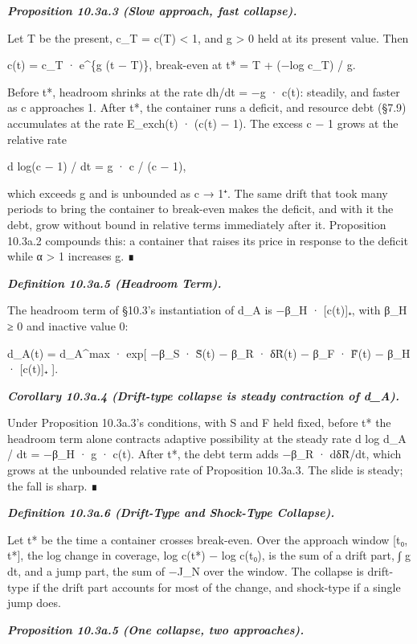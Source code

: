 \documentclass[
]{article}
\begin{document}
\emph{\textbf{Proposition 10.3a.3 (Slow approach, fast collapse).}}

Let T be the present, c\_T = c(T) \textless{} 1, and g \textgreater{} 0
held at its present value. Then

c(t) = c\_T · e\^{}\{g (t − T)\}, break-even at t* = T + (−log c\_T) /
g.

Before t*, headroom shrinks at the rate dh/dt = −g · c(t): steadily, and
faster as c approaches 1. After t*, the container runs a deficit, and
resource debt (§7.9) accumulates at the rate E\_exch(t) · (c(t) − 1).
The excess c − 1 grows at the relative rate

d log(c − 1) / dt = g · c / (c − 1),

which exceeds g and is unbounded as c → 1⁺. The same drift that took
many periods to bring the container to break-even makes the deficit, and
with it the debt, grow without bound in relative terms immediately after
it. Proposition 10.3a.2 compounds this: a container that raises its
price in response to the deficit while α \textgreater{} 1 increases g. ∎

\emph{\textbf{Definition 10.3a.5 (Headroom Term).}}

The headroom term of §10.3's instantiation of d\_A is −β\_H ·
{[}c(t){]}₊, with β\_H ≥ 0 and inactive value 0:

d\_A(t) = d\_A\^{}max · exp{[} −β\_S · S̃(t) − β\_R · δR̃(t) − β\_F · F̃(t)
− β\_H · {[}c(t){]}₊ {]}.

\emph{\textbf{Corollary 10.3a.4 (Drift-type collapse is steady
contraction of d\_A).}}

Under Proposition 10.3a.3's conditions, with S and F held fixed, before
t* the headroom term alone contracts adaptive possibility at the steady
rate d log d\_A / dt = −β\_H · g · c(t). After t*, the debt term adds
−β\_R · dδR̃/dt, which grows at the unbounded relative rate of
Proposition 10.3a.3. The slide is steady; the fall is sharp. ∎

\emph{\textbf{Definition 10.3a.6 (Drift-Type and Shock-Type Collapse).}}

Let t* be the time a container crosses break-even. Over the approach
window {[}t₀, t*{]}, the log change in coverage, log c(t*) − log c(t₀),
is the sum of a drift part, ∫ g dt, and a jump part, the sum of −J\_N
over the window. The collapse is drift-type if the drift part accounts
for most of the change, and shock-type if a single jump does.

\emph{\textbf{Proposition 10.3a.5 (One collapse, two approaches).}}
\end{document}
